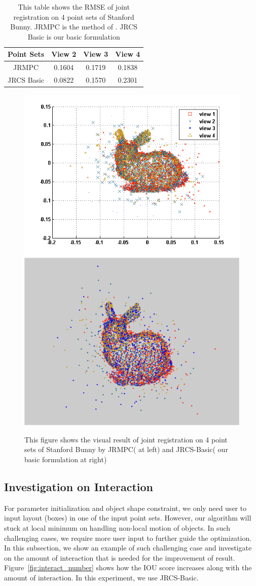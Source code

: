 \begin{table}
	\centering
	\caption{This table shows the RMSE of joint registration on 4 point sets of Stanford Bunny. JRMPC is the method of \cite{Evangelidis2014}. JRCS Basic is our basic formulation}
	\begin{tabular}{c c c c}
		Point Sets& View 2 & View 3 & View 4 \\
		\hline
		JRMPC & 0.1604 & 0.1719 & 0.1838\\   
		JRCS Basic & 0.0822 &  0.1570  & 0.2301\\
	\end{tabular}
	\label{tab:reg}
\end{table}
\begin{figure}[htb]
	\centering
	\includegraphics[width=0.4\linewidth]{images/JRMPC.png}
	\includegraphics[width=0.4\linewidth]{images/JRCSReg.png}
	\caption{This figure shows the visual result of joint registration on 4 point sets of Stanford Bunny by JRMPC(\cite{Evangelidis2014} at left) and JRCS-Basic( our basic formulation at right) }
	\label{fig:reg}
\end{figure}

\subsection{Investigation on Interaction}
\label{subsec:interact}

For parameter initialization and object shape constraint, we only need user to input layout (boxes) in one of the input point sets. However, our algorithm will stuck at local minimum on handling non-local motion of objects. In such challenging cases, we require more user input to further guide the optimization. In this subsection, we show an example of such challenging case and investigate on the amount of interaction that is needed for the improvement of result. Figure~\ref{fig:interact_number} shows how the IOU score increases along with the amount of interaction. In this experiment, we use JRCS-Basic. 
 
